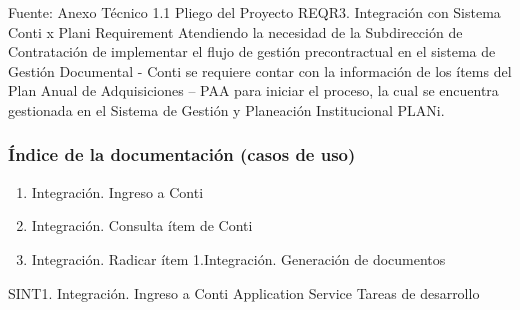 \documentclass[
  paper=a4,
  ,captions=tableheading
]{scrartcl}
\providecommand{\tightlist}{%
  \setlength{\itemsep}{0pt}\setlength{\parskip}{0pt}}
\begin{document}
Fuente: Anexo Técnico 1.1 Pliego del Proyecto \textbar{} \textbar{}
REQR3. Integración con Sistema Conti x Plani \textbar{} Requirement
\textbar{} Atendiendo la necesidad de la Subdirección de Contratación de
implementar el flujo de gestión precontractual en el sistema de Gestión
Documental - Conti se requiere contar con la información de los ítems
del Plan Anual de Adquisiciones -- PAA para iniciar el proceso, la cual
se encuentra gestionada en el Sistema de Gestión y Planeación
Institucional PLANi.

\subsubsection{Índice de la documentación (casos de
uso)}\label{sec:uxedndice-de-la-documentaciuxf3n-casos-de-uso-2}

\begin{enumerate}
\def\labelenumi{\arabic{enumi}.}
\tightlist
\item
  Integración. Ingreso a Conti
\item
  Integración. Consulta ítem de Conti
\item
  Integración. Radicar ítem 1.Integración. Generación de documentos
\end{enumerate}

\textbar{} \textbar{} SINT1. Integración. Ingreso a Conti \textbar{}
Application Service \textbar{} Tareas de desarrollo
\end{document}
